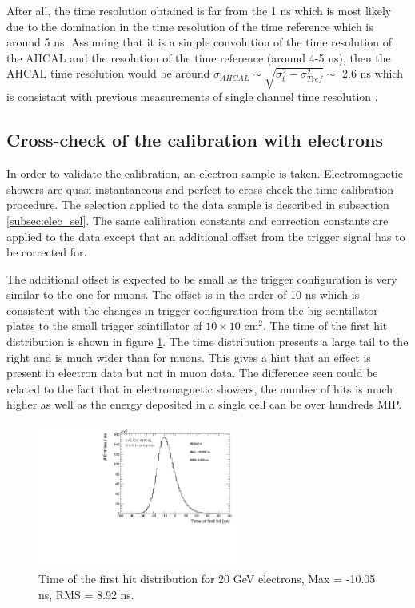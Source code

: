 After all, the time resolution obtained is far from the 1 ns which is most likely due to the domination in the time resolution of the time reference which is around 5 ns. Assuming that it is a simple convolution of the time resolution of the AHCAL and the resolution of the time reference (around 4-5 ns), then the AHCAL time resolution would be around $\sigma_{AHCAL} \sim \sqrt{\sigma_{t}^2 - \sigma_{Tref}^2} \sim$ 2.6 ns which is consistant with previous measurements of single channel time resolution \cite{Laurien2016}.

\subsection{Cross-check of the calibration with electrons}
\label{subsec:validation}

In order to validate the calibration, an electron sample is taken. Electromagnetic showers are quasi-instantaneous and perfect to cross-check the time calibration procedure. The selection applied to the data sample is described in subsection \ref{subsec:elec_sel}. The same calibration constants and correction constants are applied to the data except that an additional offset from the trigger signal has to be corrected for.

The additional offset is expected to be small as the trigger configuration is very similar to the one for muons. The offset is in the order of 10 ns which is consistent with the changes in trigger configuration from the big scintillator plates to the small trigger scintillator of $10\times10$ cm$^2$. The time of the first hit distribution is shown in figure \ref{fig:Timing_electrons}. The time distribution presents a large tail to the right and is much wider than for muons. This gives a hint that an effect is present in electron data but not in muon data. The difference seen could be related to the fact that in electromagnetic showers, the number of hits is much higher as well as the energy deposited in a single cell can be over hundreds MIP.

\begin{figure}[htbp!]
	\centering
	\includegraphics[width=0.6\textwidth]{chap5/fig_AHCAL_timing/Electrons/Timing_AllLayers_AfterMuons.pdf}
	\caption{Time of the first hit distribution for 20 GeV electrons, Max = -10.05 ns, RMS = 8.92 ns.}
	\label{fig:Timing_electrons}
\end{figure}

